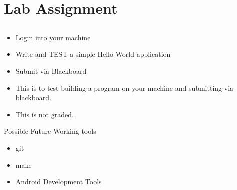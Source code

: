 \documentclass{beamer}
\begin{document}
\section{Lab Assignment}
\subsection{}
\begin{frame}{}
\begin{itemize}
\item Login into your machine
\item Write and TEST a simple Hello World application
\item Submit via Blackboard
\item This is to test building a program on your machine and submitting via blackboard.
\item This is not graded.
\end{itemize}
\end{frame}

\begin{frame}{Possible Future Working tools}
\begin{itemize}
\item git
\item make
\item Android Development Tools
\end{itemize}
\end{frame}

\end{document}
